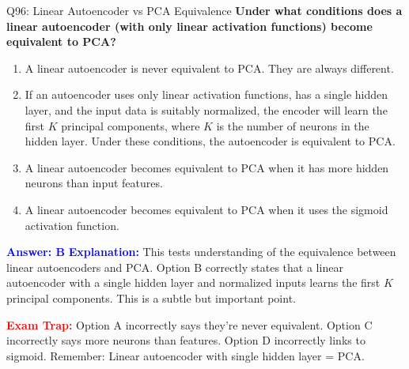 \documentclass[8pt]{beamer}
\begin{document}
	\begin{frame}{Q96: Linear Autoencoder vs PCA Equivalence}
		\fontsize{6.5}{7.5}\selectfont
		\textbf{Under what conditions does a linear autoencoder (with only linear activation functions) become equivalent to PCA?}
		
		\begin{enumerate}
			\item A linear autoencoder is never equivalent to PCA. They are always different.
			\item If an autoencoder uses only linear activation functions, has a single hidden layer, and the input data is suitably normalized, the encoder will learn the first $K$ principal components, where $K$ is the number of neurons in the hidden layer. Under these conditions, the autoencoder is equivalent to PCA.
			\item A linear autoencoder becomes equivalent to PCA when it has more hidden neurons than input features.
			\item A linear autoencoder becomes equivalent to PCA when it uses the sigmoid activation function.
		\end{enumerate}
		
		\vspace{0.1cm}
		\textcolor{blue}{\textbf{Answer: B}}
		\vspace{0.1cm}
		\textcolor{blue}{\textbf{Explanation:}} This tests understanding of the equivalence between linear autoencoders and PCA. Option B correctly states that a linear autoencoder with a single hidden layer and normalized inputs learns the first $K$ principal components. This is a subtle but important point.
		
		\textcolor{red}{\textbf{Exam Trap:}} Option A incorrectly says they're never equivalent. Option C incorrectly says more neurons than features. Option D incorrectly links to sigmoid. Remember: Linear autoencoder with single hidden layer = PCA.
	\end{frame}
	
\end{document}
